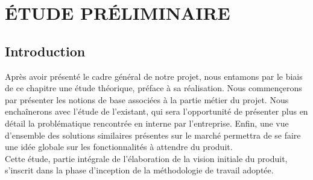 \setcounter{chapter}{1}
\chapter{ÉTUDE PRÉLIMINAIRE}
\minitoc %
\graphicspath{{Chapitre2/figures/}}


\pagestyle{fancy}
\fancyhf{}
\fancyhead[R]{\bfseries\rightmark}
\fancyfoot[R]{\thepage}
\renewcommand{\headrulewidth}{0.5pt}
\renewcommand{\footrulewidth}{0pt}
\renewcommand{\chaptermark}[1]{\markboth{\MakeUppercase{\chaptername~\thechapter. #1 }}{}}
\renewcommand{\sectionmark}[1]{\markright{\thechapter.\thesection~ #1}}

\begin{spacing}{1.5}

\section*{Introduction}
Après avoir présenté le cadre général de notre projet, nous entamons par le biais de ce chapitre une étude théorique, préface à sa réalisation. Nous commençerons par présenter les notions de base associées à la partie métier du projet. Nous enchaînerons avec l'étude de l'existant, qui sera l'opportunité de présenter plus en détail la problématique rencontrée en interne par l'entreprise. Enfin, une vue d'ensemble des solutions similaires présentes sur le marché permettra de se faire une idée globale sur les fonctionnalités à attendre du produit.\\
Cette étude, partie intégrale de l'élaboration de la vision initiale du produit, s'inscrit dans la phase d'inception de la méthodologie de travail adoptée.



\end{spacing}
